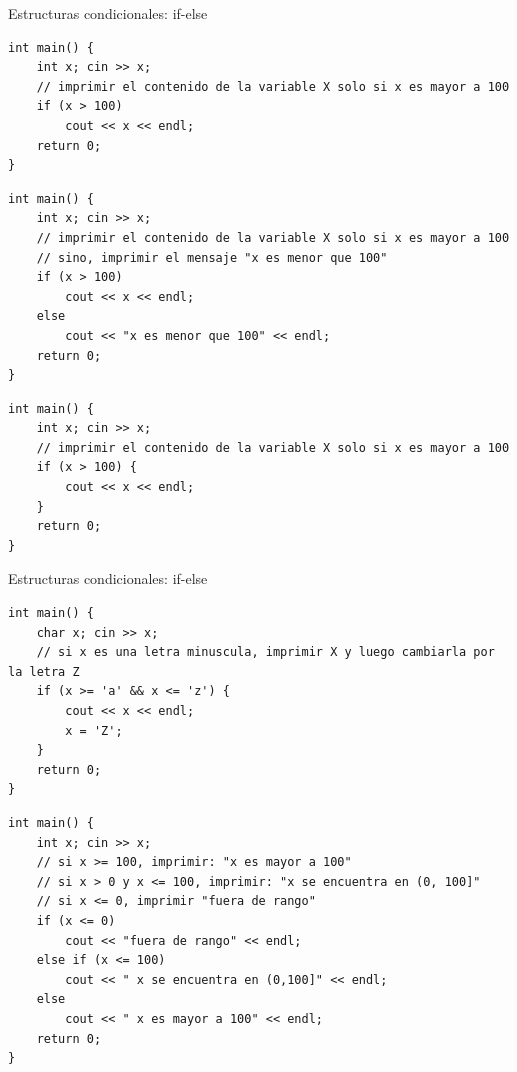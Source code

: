 \documentclass[12pt]{beamer}
\begin{document}
\begin{frame}[fragile]{Estructuras condicionales: if-else}
\begin{lstlisting}[basicstyle=\tiny]
int main() {
    int x; cin >> x;
    // imprimir el contenido de la variable X solo si x es mayor a 100
    if (x > 100)
        cout << x << endl;
    return 0;
}
\end{lstlisting}
\begin{lstlisting}[basicstyle=\tiny]
int main() {
    int x; cin >> x;
    // imprimir el contenido de la variable X solo si x es mayor a 100
    // sino, imprimir el mensaje "x es menor que 100"
    if (x > 100)
        cout << x << endl;
    else
        cout << "x es menor que 100" << endl;
    return 0;
}
\end{lstlisting}
\begin{lstlisting}[basicstyle=\tiny]
int main() {
    int x; cin >> x;
    // imprimir el contenido de la variable X solo si x es mayor a 100
    if (x > 100) {
        cout << x << endl;
    }
    return 0;
}
    \end{lstlisting}
\end{frame}

\begin{frame}[fragile]{Estructuras condicionales: if-else}
\begin{lstlisting}[basicstyle=\tiny]
int main() {
    char x; cin >> x;
    // si x es una letra minuscula, imprimir X y luego cambiarla por la letra Z
    if (x >= 'a' && x <= 'z') {
        cout << x << endl;
        x = 'Z';
    }
    return 0;
}
\end{lstlisting}
\begin{lstlisting}[basicstyle=\tiny]
int main() {
    int x; cin >> x;
    // si x >= 100, imprimir: "x es mayor a 100"
    // si x > 0 y x <= 100, imprimir: "x se encuentra en (0, 100]"
    // si x <= 0, imprimir "fuera de rango"
    if (x <= 0)
        cout << "fuera de rango" << endl;
    else if (x <= 100)
        cout << " x se encuentra en (0,100]" << endl;
    else
        cout << " x es mayor a 100" << endl;
    return 0;
}
\end{lstlisting}
\end{frame}
\end{document}
